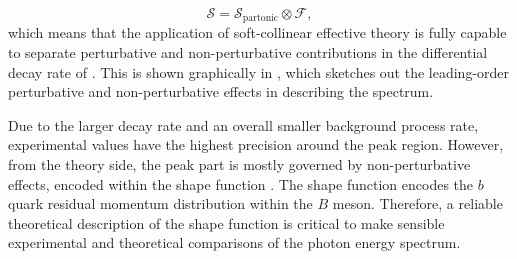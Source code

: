 \begin{equation}\label{eq:factorisation}
    \mathcal{S} = \mathcal{S}_{\mathrm{partonic}} \otimes \mathcal{F},
\end{equation}
which means that the application of soft-collinear effective theory is fully capable to separate perturbative and non-perturbative contributions in the differential decay rate of \BtoXsgamma.
This is shown graphically in , which sketches out the leading-order perturbative and non-perturbative effects in describing the \BtoXsgamma spectrum.

Due to the larger \BtoXsgamma decay rate and an overall smaller background process rate, experimental values have the highest precision around the peak region.
However, from the theory side, the peak part is mostly governed by non-perturbative effects, encoded within the shape function \cite{Ligeti:2008ac}.
The shape function encodes the $b$ quark residual momentum distribution within the $B$ meson. 
Therefore, a reliable theoretical description of the shape function is critical to make sensible experimental and theoretical comparisons of the photon energy spectrum. 

